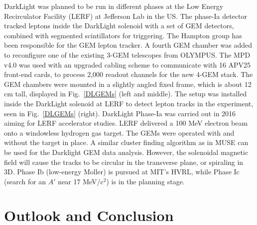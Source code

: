 \documentclass{PoS}
\begin{document}
DarkLight was planned to be run in different phases at the Low Energy
Recirculator Facility (LERF) at Jefferson Lab in the US.
The phase-Ia detector tracked leptons inside the DarkLight solenoid with a
set of GEM detectors, combined with segmented scintillators for triggering.
The Hampton group has been responsible for the GEM lepton tracker.
A fourth GEM chamber was added to reconfigure one of the existing 3-GEM
telescopes from OLYMPUS. The MPD v4.0 was used with an upgraded cabling
scheme to communicate with 16 APV25 front-end cards, to process 2,000
readout channels for the new 4-GEM stack. The GEM chambers were mounted in a
slightly angled fixed frame, which is about 12 cm tall, displayed in
Fig.~\ref{DLGEMs} (left and middle). The setup was installed inside the
DarkLight solenoid at LERF to detect lepton tracks in the experiment, seen in 
Fig.~\ref{DLGEMs} (right). DarkLight Phase-Ia was carried
out in 2016 aiming for LERF accelerator studies. LERF delivered a 100 MeV
electron beam onto a windowless hydrogen gas target. The GEMs were
operated with and without the target in place.
A similar cluster finding algorithm as in MUSE can be used for the Darklight
GEM data analysis. However, the solenoidal magnetic field will cause
the tracks to be circular in the transverse plane, or spiraling in 3D.
Phase Ib (low-energy Moller) is pursued at MIT's HVRL, while Phase Ic (search
for an $A'$ near 17 MeV/c$^2$) is in the planning stage. 

\section{Outlook and Conclusion}
\end{document}
